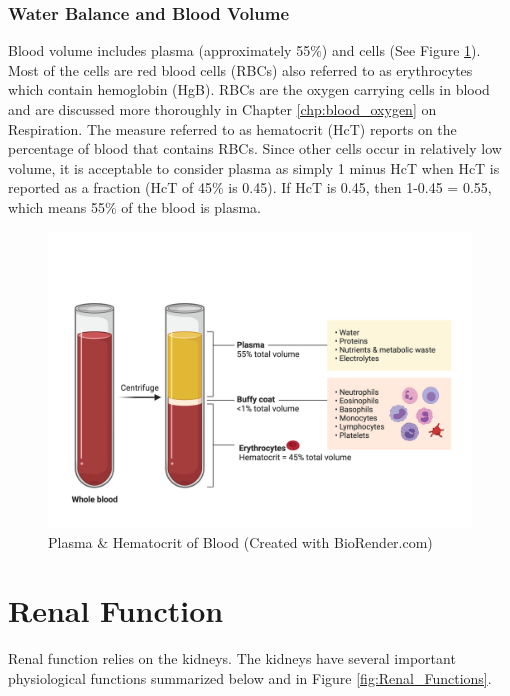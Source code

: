 \subsubsection{Water Balance and Blood Volume}

Blood volume includes plasma (approximately 55\%) and cells (See Figure \ref{fig:Hematocrit}). Most of the cells are red blood cells (RBCs) also referred to as erythrocytes which contain hemoglobin (HgB). RBCs are the oxygen carrying cells in blood and are discussed more thoroughly in Chapter \ref{chp:blood_oxygen} on Respiration. The measure referred to as hematocrit (HcT) reports on the percentage of blood that contains RBCs. Since other cells occur in relatively low volume, it is acceptable to consider plasma as simply 1 minus HcT when HcT is reported as a fraction (HcT of 45\% is 0.45). If HcT is 0.45, then 1-0.45 = 0.55, which means 55\% of the blood is plasma.

\begin{figure}[!h]
    \centering
    \includegraphics[width=1\linewidth]{./figure/Hematocrit.png}
    \caption{Plasma \& Hematocrit of Blood \footnotesize{(Created with BioRender.com)}}
    \label{fig:Hematocrit}
\end{figure}

\section{Renal Function}

Renal function relies on the kidneys. The kidneys have several important physiological functions summarized below and in Figure \ref{fig:Renal_Functions}. 

